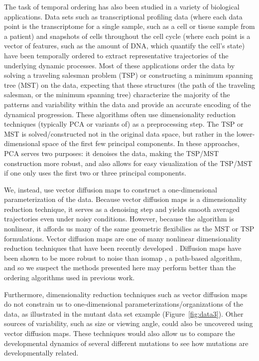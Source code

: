\documentclass{pnastwo}
\begin{document}
\begin{article}
The task of temporal ordering has also been studied in a variety of biological applications. 
%
Data sets such as transcriptional profiling data (where each data point is the transcriptome for a single sample, such as a cell or tissue sample from a patient) \cite{anavy2014blind, trapnell2014dynamics,gupta2008extracting, qiu2011discovering} and snapshots of cells throughout the cell cycle (where each point is a vector of features, such as the amount of DNA, which quantify the cell's state)  \cite{kafri2013dynamics} have been temporally ordered to extract representative trajectories of the underlying dynamic processes.
%
Most of these applications order the data by solving a traveling salesman problem (TSP) or constructing a minimum spanning tree (MST) on the data,
expecting that these structures (the path of the traveling salesman, or the minimum spanning tree) characterize the majority of the patterns and variability within the data and provide an accurate encoding of the dynamical progression.
%
These algorithms often use dimensionality reduction techniques (typically PCA or variants of) as a preprocessing step.
%
The TSP or MST is solved/constructed not in the original data space, but rather in the lower-dimensional space of the first few principal components.
%
In these approaches, PCA serves two purposes: it denoises the data, making the TSP/MST construction more robust, and also allows for easy visualization of the TSP/MST if one only uses the first two or three principal components.

We, instead, use vector diffusion maps to construct a one-dimensional parameterization of the data.
%
Because vector diffusion maps is a dimensionality reduction technique, it serves as a denoising step and yields smooth averaged trajectories even under noisy conditions. 
%
However, because the algorithm is nonlinear, it affords us many of the same geometric flexibilies as the MST or TSP formulations. 
%
Vector diffusion maps are one of many nonlinear dimensionality reduction techniques that have been recently developed \cite{Belkin2003, tenenbaum2000global, Donoho2003, Roweis2000}.
%
Diffusion maps have been shown to be more robust to noise than isomap \cite{balasubramanian2002isomap}, a path-based algorithm, and so we suspect the methods presented here may perform better than the ordering algorithms used in previous work.

Furthermore, dimensionality reduction techniques such as vector diffusion maps do not constrain us to one-dimensional parameterizations/organizations of the data, as illustrated in the mutant data set example (Figure~\ref{fig:data3}).
%
Other sources of variability, such as size or viewing angle, could also be uncovered using vector diffusion maps.
%
These techniques would also allow us to compare the developmental dynamics of several different mutations to see how mutations are developmentally related. 


\end{article}
\end{document}
